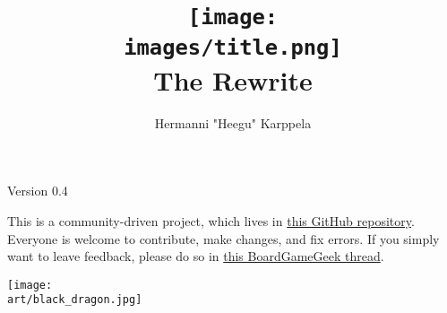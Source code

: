 \documentclass[12pt]{article}
\def\_assets{assets}
\def\art{\_assets/art}
\def\images{\_assets/images}
\def\layout{\_assets/layout}
\begin{document}
\begin{titlepage}
\end{titlepage}

\title{\texttt{[image: \\images/title.png]}\\The Rewrite}

\author{Hermanni "Heegu" Karppela}
\maketitle

\begin{center}
Version 0.4
\end{center}

\bigbreak

This is a community-driven project, which lives in \href{https://github.com/Heegu-sama/Homm3BG}{this GitHub repository}.
Everyone is welcome to contribute, make changes, and fix errors.
If you simply want to leave feedback, please do so in \href{https://boardgamegeek.com/thread/3235221/rule-book-rewrite-project}{this BoardGameGeek thread}.

\clearpage

\begin{multicols*}{2}
\tableofcontents
\vspace*{\fill}
\columnbreak
\vspace*{\fill}
\texttt{[image: \\art/black\_dragon.jpg]}
\end{multicols*}

\clearpage








\end{document}
